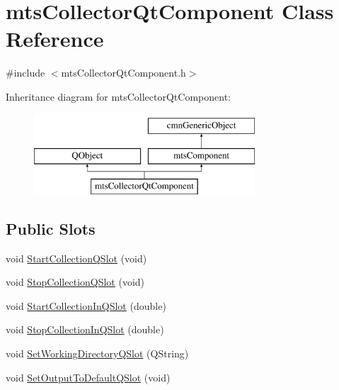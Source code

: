 \hypertarget{classmts_collector_qt_component}{\section{mts\-Collector\-Qt\-Component Class Reference}
\label{classmts_collector_qt_component}
}


{\ttfamily \#include $<$mts\-Collector\-Qt\-Component.\-h$>$}

Inheritance diagram for mts\-Collector\-Qt\-Component\-:\begin{figure}[H]
\begin{center}
\leavevmode
\includegraphics[height=3.000000cm]{db/d7d/classmts_collector_qt_component}
\end{center}
\end{figure}
\subsection*{Public Slots}
\begin{DoxyCompactItemize}
\item 
void \hyperlink{classmts_collector_qt_component_a629ac8e81a8cd7056d99ec812da2c444}{Start\-Collection\-Q\-Slot} (void)
\item 
void \hyperlink{classmts_collector_qt_component_afdde2c1e32019418355cfd56158af173}{Stop\-Collection\-Q\-Slot} (void)
\item 
void \hyperlink{classmts_collector_qt_component_a2ba72b7f73c44e84817a329336768173}{Start\-Collection\-In\-Q\-Slot} (double)
\item 
void \hyperlink{classmts_collector_qt_component_a4cc743aaa5f51cb6a820e399517994c4}{Stop\-Collection\-In\-Q\-Slot} (double)
\item 
void \hyperlink{classmts_collector_qt_component_a6091a557d5527764ed75d937a1d59ef5}{Set\-Working\-Directory\-Q\-Slot} (Q\-String)
\item 
void \hyperlink{classmts_collector_qt_component_a2cdff243e23b974c17381c406da4c1b8}{Set\-Output\-To\-Default\-Q\-Slot} (void)
\end{DoxyCompactItemize}
